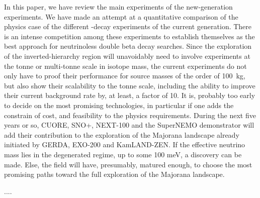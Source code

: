 \documentclass{PoS}
\begin{document}
In this paper, we have review the main experiments of the new-generation experiments. We have made an attempt at a quantitative comparison of the physics case of the different \bbonu-decay experiments of the current generation. There is an intense competition among these experiments to establish themselves as the best approach for neutrinoless double beta decay searches.  Since the exploration of the inverted-hierarchy region will unavoidably need to involve experiments at the tonne or multi-tonne scale in isotope mass, the current experiments do not only have to proof their performance for source masses of the order of 100~kg, but also show their scalability to the tonne scale, including the ability to improve their current background rate by, at least, a factor of 10. It is, probably too early to decide on the most promising technologies, in particular if one adds the constrain of cost, and feasibility to the physics requirements. During the next five years or so, CUORE, SNO+, NEXT-100 and the SuperNEMO demonstrator will add their contribution to the exploration of the Majorana landscape already initiated by GERDA, EXO-200 and KamLAND-ZEN. If the effective neutrino mass lies in the degenerated regime, up to some 100 meV, a discovery can be made. Else, the field will have, presumably, matured enough, to choose the most promising paths toward the full exploration of the Majorana landscape.  








\begin{thebibliography}{99}
....

\end{thebibliography}
\end{document}
